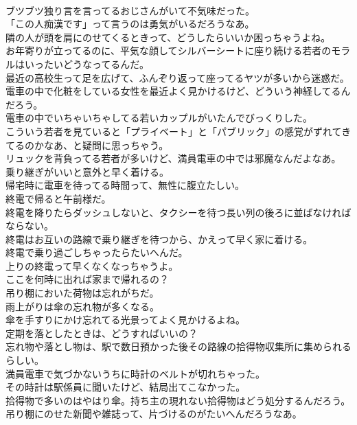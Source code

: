 \documentclass[8pt]{extreport}
\begin{document}
\begin{CJK}{UTF8}{min}
\\	ブツブツ独り言を言ってるおじさんがいて不気味だった。	
\\	「この人痴漢です」って言うのは勇気がいるだろうなあ。	
\\	隣の人が頭を肩にのせてくるときって、どうしたらいいか困っちゃうよね。	
\\	お年寄りが立ってるのに、平気な顔してシルバーシートに座り続ける若者のモラルはいったいどうなってるんだ。	
\\	最近の高校生って足を広げて、ふんぞり返って座ってるヤツが多いから迷惑だ。	
\\	電車の中で化粧をしている女性を最近よく見かけるけど、どういう神経してるんだろう。	
\\	電車の中でいちゃいちゃしてる若いカップルがいたんでびっくりした。	
\\	こういう若者を見ていると「プライベート」と「パブリック」の感覚がずれてきてるのかなあ、と疑問に思っちゃう。	
\\	リュックを背負ってる若者が多いけど、満員電車の中では邪魔なんだよなあ。	
\\	乗り継ぎがいいと意外と早く着ける。	
\\	帰宅時に電車を待ってる時間って、無性に腹立たしい。	
\\	終電で帰ると午前様だ。	
\\	終電を降りたらダッシュしないと、タクシーを待つ長い列の後ろに並ばなければならない。	
\\	終電はお互いの路線で乗り継ぎを待つから、かえって早く家に着ける。	
\\	終電で乗り過ごしちゃったらたいへんだ。	
\\	上りの終電って早くなくなっちゃうよ。	
\\	ここを何時に出れば家まで帰れるの？	
\\	吊り棚においた荷物は忘れがちだ。	
\\	雨上がりは傘の忘れ物が多くなる。	
\\	傘を手すりにかけ忘れてる光景ってよく見かけるよね。	
\\	定期を落としたときは、どうすればいいの？	
\\	忘れ物や落とし物は、駅で数日預かった後その路線の拾得物収集所に集められるらしい。	
\\	満員電車で気づかないうちに時計のベルトが切れちゃった。	
\\	その時計は駅係員に聞いたけど、結局出てこなかった。	
\\	拾得物で多いのはやはり傘。持ち主の現れない拾得物はどう処分するんだろう。	
\\	吊り棚にのせた新聞や雑誌って、片づけるのがたいへんだろうなあ。	

\end{CJK}
\end{document}
